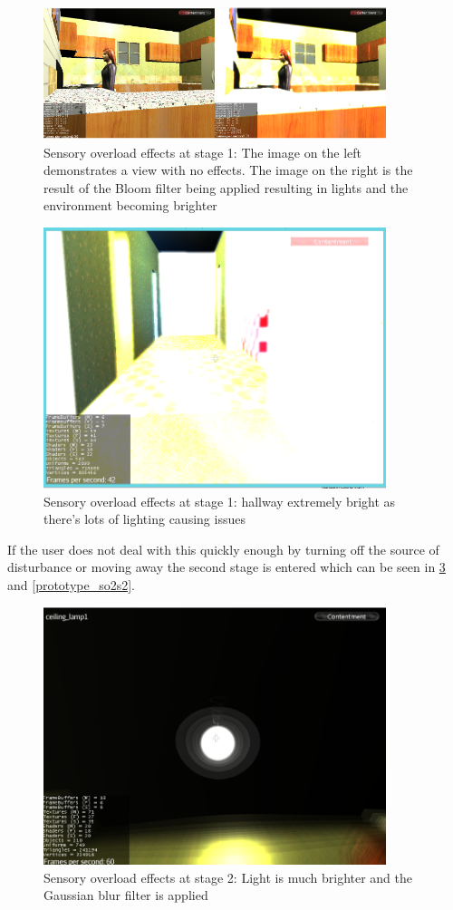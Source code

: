 \begin{figure}[H]
\centering
\includegraphics[width=100mm]{images/prototype/old_sensoryeffects.png}
\caption{Sensory overload effects at stage 1: The image on the left demonstrates a view with no effects. The image on the right is the result of the Bloom filter being applied resulting in lights and the environment becoming brighter}
\label{prototype_so1s1}
\end{figure}

\begin{figure}[H]
\centering
\includegraphics[width=100mm]{images/prototype/hallway_so1.png}
\caption{Sensory overload effects at stage 1: hallway extremely bright as there's lots of lighting causing issues}
\label{prototype_so2s1}
\end{figure}

If the user does not deal with this quickly enough by turning off the source of disturbance or moving away the second stage is entered which can be seen in \ref{prototype_so1s2} and \ref{prototype_so2s2}. 

\begin{figure}[H]
\centering
\includegraphics[width=100mm]{images/prototype/bedroom_lightsensory.png}
\caption{Sensory overload effects at stage 2: Light is much brighter and the Gaussian blur filter is applied}
\label{prototype_so1s2}
\end{figure}

